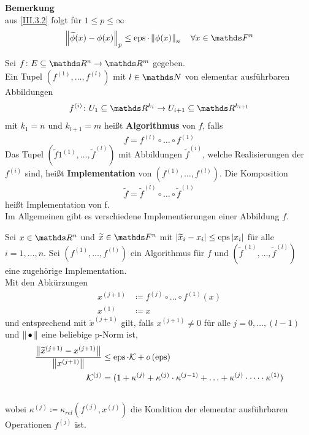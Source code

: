 \textbf{Bemerkung}\\
aus \eqref{III.3.2} folgt für $1\leq p\leq \infty$
\begin{gather}
  \nn[\widetilde{\phi}(x)-\phi(x)]_p \leq \Eps\cdot\nn[\phi(x)]_n 
  \quad \forall x\in\F^n \label{III.3.3}
\end{gather}


\begin{Defe}
  Sei $f\colon E\subseteq \Ren \to \R^m$ gegeben.\\
  Ein Tupel $\left(f^{(1)},\ldots ,f^{(l)}\right)$ mit $l\in \N$ von elementar ausführbaren
  Abbildungen
  \begin{gather*}
    f^{(i)}\colon U_1\subseteq \R^{k_i} \to U_{i+1}\subseteq \R^{k_{i+1}}
  \end{gather*}
  mit $k_1=n$ und $k_{l+1}=m$ heißt \textbf{Algorithmus} von $f$, falls
  \begin{gather*}
    f=f	^{(l)}\circ \dotsc \circ f^{(1)}
  \end{gather*}
  Das Tupel $(\widetilde{f}1^{(1)},\ldots ,\widetilde{f}^{(l)})$ mit Abbildungen $\widetilde{f}^{(i)}$, welche Realisierungen der $f^{(i)}$ sind,
  heißt \textbf{Implementation} von 
  $\left(f^{(1)},\dotsc ,f^{(l)}\right)$.
  Die Komposition 
  \begin{gather*}
    \widetilde{f}=\widetilde{f}	^{(l)}\circ \dotsc \circ \widetilde{f}^{(1)}
  \end{gather*}
  heißt Implementation von f. \\
  Im Allgemeinen gibt es verschiedene Implementierungen einer Abbildung $f$.
\end{Defe}


\begin{Leme}[Fehlerfortpflanzung]
  \label{3.3.5} 
  Sei $x\in \Ren$ und $\widetilde{x}\in \F^n$ mit $|\widetilde{x}_i-x_i|\leq \operatorname{eps}|x_i|$ für alle 
  $i=1,\ldots , n$.
  Sei $\left(f^{(1)},\dotsc ,f^{(l)}\right)$ ein Algorithmus für $f$ und 
  $(\widetilde{f}^{(1)},\dotsc ,\widetilde{f}^{(l)})$ eine zugehörige Implementation. \\
  Mit den Abkürzungen
  \begin{align*}
    x^{(j+1)} &\coloneqq f^{(j)}\circ \dotsc \circ f^{(1)}(x) \\
    x^{(1)} &\coloneqq x
  \end{align*}
  und entsprechend mit $\widetilde{x}^{(j+1)}$ gilt,
  falls $x^{(j+1)} \neq 0$ für alle $j=0,\dotsc , (l-1)$ und $\left\| \,\bullet\, \right\|$ eine beliebige p-Norm ist,
  \begin{align}
    \frac{\nn[\widetilde{x}^{(j+1)}-x^{(j+1)}]}{\nn[x^{(j+1)}]}
    &\leq \Eps \cdot \K + o\left(\Eps\right)
      \label{III.3.4} 
    \\ \nonumber
    \K^{(j)}&=(1+\kappa^{(j)}+\kappa^{(j)}\cdot \kappa^{(j-1)}+ \ldots + \kappa^{(j)}\cdot \dotsm \cdot \kappa^{(1)}) \\ \nonumber
  \end{align}
  wobei $	\kappa^{(j)} \coloneqq \kappa_{rel}(f^{(j)}, x^{(j)})$ die Kondition der elementar ausführbaren Operationen $f^{(j)}$ ist.
\end{Leme}


